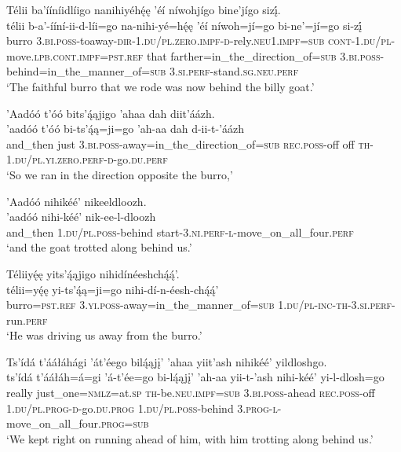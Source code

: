 \ea\label{ex:text6-8-10}
Télii ba’ííníidlíigo nanihiyéhę́ę ’éí níwohjígo bine’jígo sizį́.\\
\gll télii	b-a’-ííní-ii-d-líi=go	na-nihi-yé=hę́ę	’éí	níwoh=jí=go	bi-ne’=jí=go	si-zį́\\
     burro	3.\textsc{bi}.\textsc{poss}-toaway-\textsc{dir}-1.\textsc{du}/\textsc{pl}.\textsc{zero}.\textsc{impf}-\textsc{d}-rely.\textsc{neu}1.\textsc{impf}=\textsc{sub}	\textsc{cont}-1.\textsc{du}/\textsc{pl}-move.\textsc{lpb}.\textsc{cont}.\textsc{impf}=\textsc{pst}.\textsc{ref}	that	farther=in\_the\_direction\_of=\textsc{sub}	3.\textsc{bi}.\textsc{poss}-behind=in\_the\_manner\_of=\textsc{sub}	3.\textsc{si}.\textsc{perf}-stand.\textsc{sg}.\textsc{neu}.\textsc{perf}\\
\glt `The faithful burro that we rode was now behind the billy goat.'
\z

\ea\label{ex:text6-8-11}
’Aadóó t’óó bits’ą́ąjigo ’ahaa dah diit’áázh.\\
\gll ’aadóó	t’óó	bi-ts’ą́ą=ji=go	’ah-aa	dah	d-ii-t-’áázh\\
     and\_then	just	3.\textsc{bi}.\textsc{poss}-away=in\_the\_direction\_of=\textsc{sub}	\textsc{rec}.\textsc{poss}-off	off	\textsc{th}-1.\textsc{du}/\textsc{pl}.\textsc{yi}.\textsc{zero}.\textsc{perf}-\textsc{d}-go.\textsc{du}.\textsc{perf}\\
\glt `So we ran in the direction opposite the burro,'
\z

\ea\label{ex:text6-8-12}
’Aadóó nihikéé’ nikeeldloozh.\\
\gll ’aadóó	nihi-kéé’	nik-ee-l-dloozh\\
     and\_then	1.\textsc{du}/\textsc{pl}.\textsc{poss}-behind	start-3.\textsc{ni}.\textsc{perf}-\textsc{l}-move\_on\_all\_four.\textsc{perf}\\
\glt `and the goat trotted along behind us.'
\z

\ea\label{ex:text6-8-13}
Téliiyę́ę yits’ą́ąjigo nihidínéeshchą́ą́’.\\
\gll télii=yę́ę	yi-ts’ą́ą=ji=go	nihi-dí-n-éesh-chą́ą́’\\
     burro=\textsc{pst}.\textsc{ref}	3.\textsc{yi}.\textsc{poss}-away=in\_the\_manner\_of=\textsc{sub}	1.\textsc{du}/\textsc{pl}-\textsc{inc}-\textsc{th}-3.\textsc{si}.\textsc{perf}-run.\textsc{perf}\\
\glt `He was driving us away from the burro.'
\z

\ea\label{ex:text6-8-14}
Ts’ídá t’ááłáhági ’át’éego bilą́ąjį’ ’ahaa yiit’ash nihikéé’ yildloshgo.\\
\gll ts’ídá	t’ááłáh=á=gi ’á-t’ée=go	bi-lą́ąjį’	’ah-aa	yii-t-’ash	nihi-kéé’	yi-l-dlosh=go\\
     really	just\_one=\textsc{nmlz}=at.\textsc{sp} \textsc{th}-be.\textsc{neu}.\textsc{impf}=\textsc{sub}	3.\textsc{bi}.\textsc{poss}-ahead	\textsc{rec}.\textsc{poss}-off	1.\textsc{du}/\textsc{pl}.\textsc{prog}-\textsc{d}-go.\textsc{du}.\textsc{prog}	1.\textsc{du}/\textsc{pl}.\textsc{poss}-behind	3.\textsc{prog}-\textsc{l}-move\_on\_all\_four.\textsc{prog}=\textsc{sub}\\
\glt `We kept right on running ahead of him, with him trotting along behind us.'
\z


